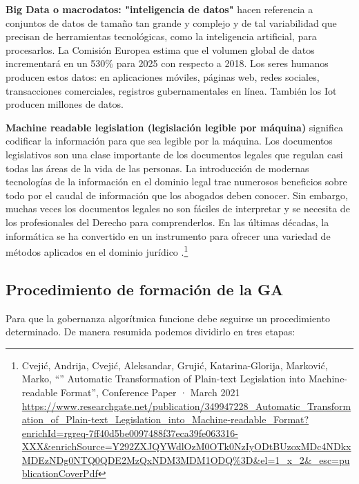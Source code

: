 \documentclass[12pt]{report} %
\begin{document}
\textbf{Big Data o macrodatos: "inteligencia de datos"} hacen referencia a conjuntos de datos de tamaño tan grande y complejo y de tal variabilidad que precisan de herramientas tecnológicas, como la inteligencia artificial, para procesarlos. La Comisión Europea estima que el volumen global de datos incrementará en un 530\% para 2025 con respecto a 2018. Los seres humanos producen estos datos: en aplicaciones móviles, páginas web, redes sociales, transacciones comerciales, registros gubernamentales en línea. También los Iot producen millones de datos.

\textbf{Machine readable legislation (legislación legible por máquina)} significa codificar la información para que sea legible por la máquina. Los documentos legislativos son una clase importante de los documentos legales que regulan casi todas las áreas de la vida de las personas. La introducción de modernas tecnologías de la información en el dominio legal trae numerosos beneficios sobre todo por el caudal de información que los abogados deben conocer. Sin embargo, muchas veces los documentos legales no son fáciles de interpretar y se necesita de los profesionales del Derecho para comprenderlos.  En las últimas décadas, la informática se ha convertido en un instrumento para ofrecer una variedad de métodos aplicados en el dominio jurídico .\footnote{Cvejić, Andrija, Cvejić, Aleksandar, Grujić, Katarina-Glorija, Marković, Marko, 
“” Automatic Transformation of Plain-text Legislation into Machine-readable Format”, Conference Paper · March 2021 \url{https://www.researchgate.net/publication/349947228_Automatic_Transformation_of_Plain-text_Legislation_into_Machine-readable_Format?enrichId=rgreq-7ff40d5be0097488f37eca39fe063316-XXX&enrichSource=Y292ZXJQYWdlOzM0OTk0NzIyODtBUzoxMDc4NDkxMDEzNDg0NTQ0QDE2MzQxNDM3MDM1ODQ\%3D&el=1_x_2&_esc=publicationCoverPdf}
}


\subsection{Procedimiento de formación de la GA}

Para que la gobernanza algorítmica funcione debe seguirse un procedimiento determinado. De manera resumida podemos dividirlo en tres etapas:
\end{document}
